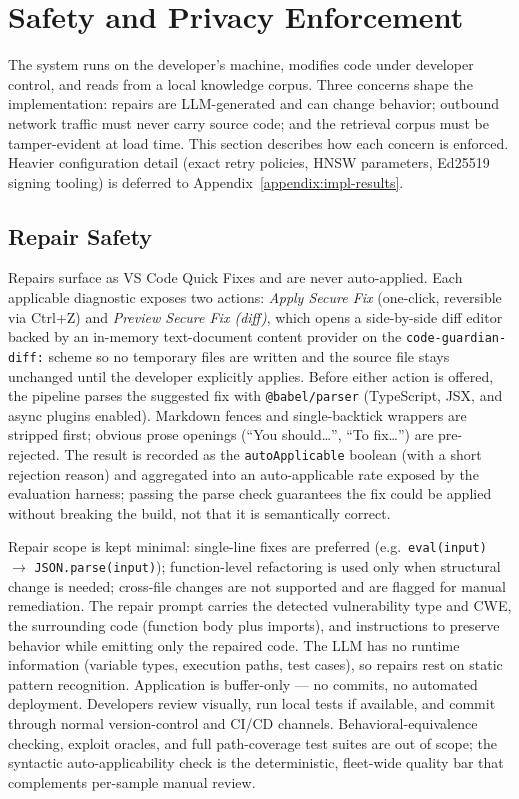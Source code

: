 \section{Safety and Privacy Enforcement}
\label{sec:impl-safety-privacy}

The system runs on the developer's machine, modifies code under developer control, and reads from a local knowledge corpus. Three concerns shape the implementation: repairs are LLM-generated and can change behavior; outbound network traffic must never carry source code; and the retrieval corpus must be tamper-evident at load time. This section describes how each concern is enforced. Heavier configuration detail (exact retry policies, HNSW parameters, Ed25519 signing tooling) is deferred to Appendix~\ref{appendix:impl-results}.

\subsection{Repair Safety}
\label{sec:impl-repair-safety}

Repairs surface as VS Code Quick Fixes and are never auto-applied. Each applicable diagnostic exposes two actions: \emph{Apply Secure Fix} (one-click, reversible via Ctrl+Z) and \emph{Preview Secure Fix (diff)}, which opens a side-by-side diff editor backed by an in-memory text-document content provider on the \texttt{code-guardian-diff:} scheme so no temporary files are written and the source file stays unchanged until the developer explicitly applies. Before either action is offered, the pipeline parses the suggested fix with \texttt{@babel/parser} (TypeScript, JSX, and async plugins enabled). Markdown fences and single-backtick wrappers are stripped first; obvious prose openings (``You should\dots'', ``To fix\dots'') are pre-rejected. The result is recorded as the \texttt{autoApplicable} boolean (with a short rejection reason) and aggregated into an auto-applicable rate exposed by the evaluation harness; passing the parse check guarantees the fix could be applied without breaking the build, not that it is semantically correct.

Repair scope is kept minimal: single-line fixes are preferred (e.g.\ \texttt{eval(input)} $\to$ \texttt{JSON.parse(input)}); function-level refactoring is used only when structural change is needed; cross-file changes are not supported and are flagged for manual remediation. The repair prompt carries the detected vulnerability type and CWE, the surrounding code (function body plus imports), and instructions to preserve behavior while emitting only the repaired code. The LLM has no runtime information (variable types, execution paths, test cases), so repairs rest on static pattern recognition. Application is buffer-only --- no commits, no automated deployment. Developers review visually, run local tests if available, and commit through normal version-control and CI/CD channels. Behavioral-equivalence checking, exploit oracles, and full path-coverage test suites are out of scope; the syntactic auto-applicability check is the deterministic, fleet-wide quality bar that complements per-sample manual review.

